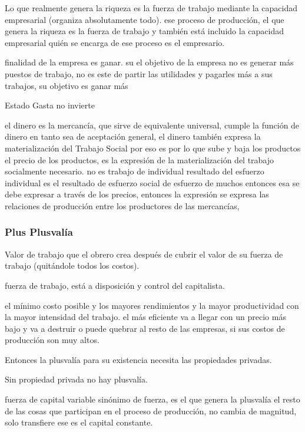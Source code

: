 \documentclass[
  letterpaper,
  DIV=11,
  numbers=noendperiod]{scrartcl}
\begin{document}
Lo que realmente genera la riqueza es la fuerza de trabajo mediante la
capacidad empresarial (organiza absolutamente todo). ese proceso de
producción, el que genera la riqueza es la fuerza de trabajo y también
está incluido la capacidad empresarial quién se encarga de ese proceso
es el empresario.

finalidad de la empresa es ganar. su el objetivo de la empresa no es
generar más puestos de trabajo, no es este de partir las utilidades y
pagarles más a sus trabajos, su objetivo es ganar más

Estado Gasta no invierte

el dinero es la mercancía, que sirve de equivalente universal, cumple la
función de dinero en tanto sea de aceptación general, el dinero también
expresa la materialización del Trabajo Social por eso es por lo que sube
y baja los productos el precio de los productos, es la expresión de la
materialización del trabajo socialmente necesario. no es trabajo de
individual resultado del esfuerzo individual es el resultado de esfuerzo
social de esfuerzo de muchos entonces esa se debe expresar a través de
los precios, entonces la expresión se expresa las relaciones de
producción entre los productores de las mercancías,

\hypertarget{plus-plusvaluxeda}{%
\subsubsection{Plus Plusvalía}\label{plus-plusvaluxeda}}

Valor de trabajo que el obrero crea después de cubrir el valor de su
fuerza de trabajo (quitándole todos los costos).

fuerza de trabajo, está a disposición y control del capitalista.

el mínimo costo posible y los mayores rendimientos y la mayor
productividad con la mayor intensidad del trabajo. el más eficiente va a
llegar con un precio más bajo y va a destruir o puede quebrar al resto
de las empresas, si sus costos de producción son muy altos.

Entonces la plusvalía para su existencia necesita las propiedades
privadas.

Sin propiedad privada no hay plusvalía.

fuerza de capital variable sinónimo de fuerza, es el que genera la
plusvalía el resto de las cosas que participan en el proceso de
producción, no cambia de magnitud, solo transfiere ese es el capital
constante.
\end{document}
